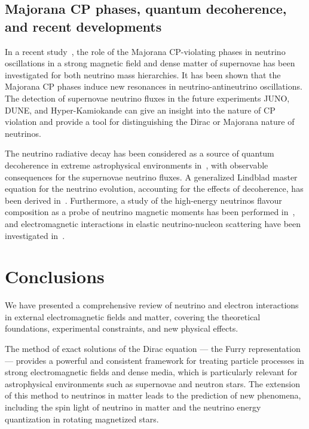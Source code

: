 \documentclass[a4paper,11pt]{article}
\begin{document}
\subsection{Majorana CP phases, quantum decoherence, and recent developments}

In a recent study~\cite{Popov:Studenikin:2021PRD}, the role of the Majorana CP-violating phases in neutrino oscillations in a strong magnetic field and dense matter of supernovae has been investigated for both neutrino mass hierarchies. It has been shown that the Majorana CP phases induce new resonances in neutrino-antineutrino oscillations. The detection of supernovae neutrino fluxes in the future experiments JUNO, DUNE, and Hyper-Kamiokande can give an insight into the nature of CP violation and provide a tool for distinguishing the Dirac or Majorana nature of neutrinos.

The neutrino radiative decay has been considered as a source of quantum decoherence in extreme astrophysical environments in~\cite{Stankevich:Studenikin:2020PRD}, with observable consequences for the supernovae neutrino fluxes. A generalized Lindblad master equation for the neutrino evolution, accounting for the effects of decoherence, has been derived in~\cite{Stankevich:2025PRD}. Furthermore, a study of the high-energy neutrinos flavour composition as a probe of neutrino magnetic moments has been performed in~\cite{Popov:Studenikin:2025PRD}, and electromagnetic interactions in elastic neutrino-nucleon scattering have been investigated in~\cite{Kouzakov:2025PRD}.



\section{Conclusions}
\label{sec:conclusions}

We have presented a comprehensive review of neutrino and electron interactions in external electromagnetic fields and matter, covering the theoretical foundations, experimental constraints, and new physical effects.

The method of exact solutions of the Dirac equation --- the Furry representation --- provides a powerful and consistent framework for treating particle processes in strong electromagnetic fields and dense media, which is particularly relevant for astrophysical environments such as supernovae and neutron stars. The extension of this method to neutrinos in matter leads to the prediction of new phenomena, including the spin light of neutrino in matter and the neutrino energy quantization in rotating magnetized stars.
\end{document}
